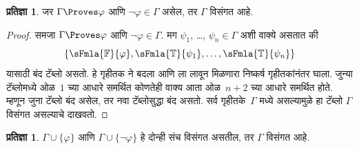 \documentclass[11pt,a4paper,openany]{book}
\theoremstyle{definition}
\newtheorem{prop}[defn]{प्रतिज्ञा}
\newcommand{\True}{\ensuremath{\mathbb{T}}}
\newcommand{\False}{\ensuremath{\mathbb{F}}}
\begin{document}
\begin{prop}\label{fol:tab:prv:prop:explicit-inc}
  जर $\Gamma \Proves \varphi$ आणि $\lnot \varphi \in \Gamma$ असेल, तर $\Gamma$
  विसंगत आहे.
\end{prop}

\begin{proof}
  समजा $\Gamma \Proves \varphi$ आणि $\lnot \varphi \in \Gamma$. मग
  $\psi_1$, \dots, $\psi_n \in \Gamma$ अशी वाक्ये असतात की
  \[
  \{\sFmla{\False}{\varphi}, \sFmla{\True}{\psi_1}, \dots, \sFmla{\True}{\psi_n}\}
  \]
  यासाठी बंद टॅब्लो असतो. \sFmla{\False}{\varphi} हे गृहीतक
  \sFmla{\True}{\lnot \varphi} ने बदला आणि \sFmla{\True}{\lnot \varphi} ला
  \TRule{\True}{\lnot} लावून मिळणारा निष्कर्ष गृहीतकांनंतर घाला. जुन्या
  टॅब्लोमध्ये ओळ~$1$ च्या आधारे समर्थित कोणतेही वाक्य आता
  ओळ~$n+2$ च्या आधारे समर्थित होते. म्हणून जुना टॅब्लो बंद असेल, तर
  नवा टॅब्लोसुद्धा बंद असतो. सर्व गृहीतके~$\Gamma$ मध्ये असल्यामुळे हा टॅब्लो
  $\Gamma$ विसंगत असल्याचे दाखवतो.
\end{proof}

\begin{prop}\label{fol:tab:prv:prop:provability-exhaustive}
  $\Gamma \cup \{\varphi\}$ आणि $\Gamma \cup \{\lnot \varphi\}$ हे दोन्ही संच
  विसंगत असतील, तर $\Gamma$ विसंगत आहे.
\end{prop}
\end{document}

